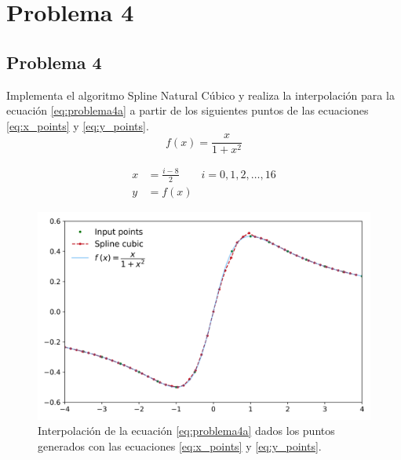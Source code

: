 \section{Problema 4}

\subsection*{Problema 4}
Implementa el algoritmo Spline Natural Cúbico y realiza la interpolación para la ecuación \ref{eq:problema4a} a partir de los siguientes puntos de las ecuaciones \ref{eq:x_points} y \ref{eq:y_points}.
\begin{equation}
	f(x) = \frac{x}{1+x^2} \label{eq:problema4a}
\end{equation}

\begin{align}
	x & = \frac{i-8}{2} \qquad i=0,1,2,\dots,16 \label{eq:x_points} \\
	y & = f(x) \label{eq:y_points}
\end{align}
\begin{figure}[H]
	\centering
	\includegraphics[width=14cm]{Graphics/problema04a.png}
	\caption{Interpolación de la ecuación \ref{eq:problema4a} dados los puntos generados con las ecuaciones \ref{eq:x_points} y \ref{eq:y_points}.}
\end{figure}
